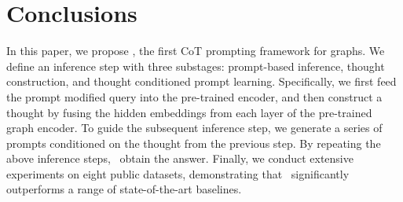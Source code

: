 \section{Conclusions}
In this paper, we propose \model, the first CoT prompting framework for graphs. We define an inference step with three substages: prompt-based inference, thought construction, and thought conditioned prompt learning. Specifically, we first feed the prompt modified query into the pre-trained encoder, and then construct a thought by fusing the hidden embeddings from each layer of the pre-trained graph encoder. To guide the subsequent inference step, we generate a series of prompts conditioned on the thought from the previous step. By repeating the above inference steps, \model\ obtain the answer. Finally, we conduct extensive experiments on eight public datasets, demonstrating that \model\ significantly outperforms a range of state-of-the-art baselines.
